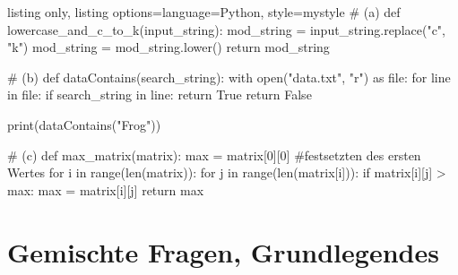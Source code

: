 \documentclass[11pt, oneside]{book}
\begin{document}
\begin{tcblisting}{listing only, listing options={language=Python, style=mystyle}}
# (a)
def lowercase_and_c_to_k(input_string):
    mod_string = input_string.replace("c", "k")
    mod_string = mod_string.lower()
    return mod_string

# (b)
def dataContains(search_string):
    with open("data.txt", "r") as file:
        for line in file:
            if search_string in line:
                return True
    return False

print(dataContains("Frog"))

# (c)
def max_matrix(matrix):
    max = matrix[0][0] #festsetzten des ersten Wertes
    for i in range(len(matrix)):
        for j in range(len(matrix[i])):
            if matrix[i][j] > max:
                max = matrix[i][j]
    return max
\end{tcblisting}

\newpage
\section{Gemischte Fragen, Grundlegendes}
\end{document}
